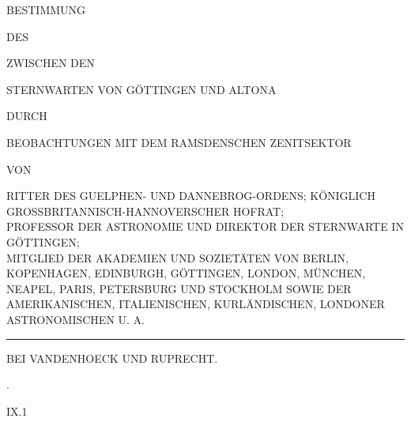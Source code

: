 \clearpage
\begin{center}
{\Large BESTIMMUNG}\par\vspace{8mm}
{\small DES}\par\vspace{8mm}
{\LARGE{}}\par\vspace{8mm}
{\small ZWISCHEN DEN}\par\vspace{7mm}
{\large STERNWARTEN VON GÖTTINGEN UND ALTONA}\par\vspace{7mm}
{\small DURCH}\par\vspace{7mm}
{\normalsize BEOBACHTUNGEN MIT DEM RAMSDENSCHEN ZENITSEKTOR}\par\vspace{7mm}
{\small VON}\par\vspace{7mm}
{\large{}}\par\smallskip
{\scriptsize
RITTER DES GUELPHEN- UND DANNEBROG-ORDENS; KÖNIGLICH GROSSBRITANNISCH-HANNOVERSCHER HOFRAT;\\
PROFESSOR DER ASTRONOMIE UND DIREKTOR DER STERNWARTE IN GÖTTINGEN;\\
MITGLIED DER AKADEMIEN UND SOZIETÄTEN VON BERLIN, KOPENHAGEN, EDINBURGH, GÖTTINGEN,
LONDON, MÜNCHEN, NEAPEL, PARIS, PETERSBURG UND STOCKHOLM SOWIE DER
AMERIKANISCHEN, ITALIENISCHEN, KURLÄNDISCHEN, LONDONER ASTRONOMISCHEN U. A.
}\par\vspace{15mm}
\rule{.35\textwidth}{.4pt}\par\medskip
{\large{}}\par\medskip
BEI VANDENHOECK UND RUPRECHT.\par{}.
\end{center}
\vfill\noindent IX.\hfill 1\par

\clearpage
\null

